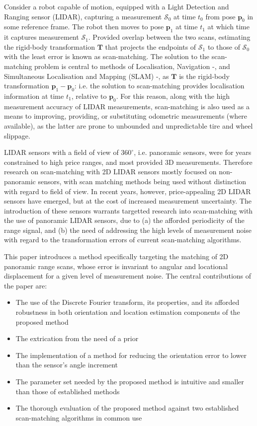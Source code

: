 Consider a robot capable of motion, equipped with a Light Detection and Ranging
sensor (LIDAR), capturing a measurement $\mathcal{S}_0$ at time $t_0$ from pose
$\bm{p}_0$ in some reference frame. The robot then moves to pose $\bm{p}_1$ at
time $t_1$ at which time it captures measurement $\mathcal{S}_1$. Provided
overlap between the two scans, estimating the rigid-body transformation
$\bm{T}$ that projects the endpoints of $\mathcal{S}_1$ to those of
$\mathcal{S}_0$ with the least error is known as scan-matching. The solution to
the scan-matching problem is central to methods of Localisation, Navigation
\cite{am_odom_4}-\cite{am_odom_6}, and Simultaneous Localisation and Mapping
(SLAM) \cite{am_odom_1}-\cite{am_odom_3}, as $\bm{T}$ is the rigid-body
transformation $\bm{p}_1 - \bm{p}_0$: i.e. the solution to scan-matching
provides localisation information at time $t_1$, relative to $\bm{p}_0$. For
this reason, along with the high measurement accuracy of LIDAR measurements,
scan-matching is also used as a means to improving, providing, or substituting
odometric measurements (where available), as the latter are prone to unbounded
and unpredictable tire and wheel slippage.

LIDAR sensors with a field of view of $360^\circ$, i.e. panoramic sensors, were
for years constrained to high price ranges, and most provided 3D measurements.
Therefore research on scan-matching with 2D LIDAR sensors mostly focused on
non-panoramic sensors, with scan matching methods being used without distinction
with regard to field of view. In recent years, however, price-appealing
2D LIDAR sensors have emerged, but at the cost of increased measurement
uncertainty. The introduction of these sensors warrants targetted research
into scan-matching with the use of panoramic LIDAR sensors, due to (a) the
afforded periodicity of the range signal, and (b) the need of
addressing the high levels of measurement noise with regard to the
transformation errors of current scan-matching algorithms.

This paper introduces a method specifically targeting the matching of 2D
panoramic range scans, whose error is invariant to angular and
locational displacement for a given level of measurement noise.
The central contributions of the paper are:

\begin{itemize}
  \item The use of the Discrete Fourier transform, its properties, and its
        afforded robustness in both orientation and location estimation
        components of the proposed method
  \item The extrication from the need of a prior
  \item The implementation of a method for reducing the orientation error to
        lower than the sensor's angle increment
  \item The parameter set needed by the proposed method is intuitive and smaller
        than those of established methods
  \item The thorough evaluation of the proposed method against two established
        scan-matching algorithms in common use
\end{itemize}

